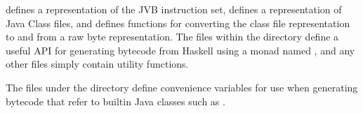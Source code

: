 \documentclass[dissertation.tex]{subfiles}
\begin{document}
{{\begin{minipage}{0.7\textwidth}

         defines a representation of the JVB instruction set,  defines a representation of Java Class files, and  defines functions for converting the class file representation to and from a raw byte representation. The files within the  directory define a useful API for generating bytecode from Haskell using a monad named , and any other files simply contain utility functions.

        The files under the  directory define convenience variables for use when generating bytecode that refer to builtin Java classes such as .
        \end{minipage}
        \hspace{5mm}
        \begin{minipage}{0.2\textwidth}
        \vspace{-2cm}
        \footnotesize
        \end{minipage}
    }
}
\end{document}
